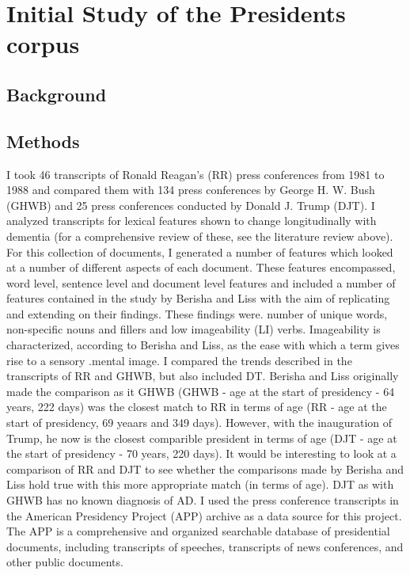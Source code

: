 \documentclass[12pt, twoside, a4paper]{article}
\begin{document}
\section{Initial Study of the Presidents corpus}
\subsection{Background}

\subsection{Methods}
I took 46 transcripts of Ronald Reagan’s (RR) press conferences from 1981 to 1988 and compared them with 134 press conferences by George H. W. Bush (GHWB) and 25 press conferences conducted by Donald J. Trump (DJT).  I analyzed transcripts for lexical features shown to change longitudinally with dementia  (for a comprehensive review of these, see the literature review above). For this collection of documents, I generated a number of features which looked at a number of different aspects of each document. These features encompassed, word level, sentence level and document level features and included a number of features contained in the study by Berisha and Liss with the aim of replicating and extending on their findings. These findings were. number of unique words, non-specific nouns and fillers and low imageability (LI) verbs. Imageability is characterized, according to Berisha and Liss, as the ease with which a term gives rise to a sensory .mental image. I compared the trends described in the transcripts of RR and GHWB, but also included DT. Berisha and Liss originally made the comparison as it GHWB (GHWB - age at the start of presidency - 64 years, 222 days) was the closest match to RR in terms of age (RR  - age at the start of presidency, 69 yeaars and 349 days). However, with the inauguration of Trump, he now is the closest comparible president in terms of age (DJT - age at the start of presidency - 70 years, 220 days). It would be interesting to look at a comparison of RR and DJT to see whether the comparisons made by Berisha and Liss hold true with this more appropriate match (in terms of age). DJT as with GHWB has no known diagnosis of AD. I used the press conference transcripts in the American Presidency Project (APP) archive as a data source for this project. The APP is a comprehensive and organized searchable database of presidential documents, including transcripts of speeches, transcripts of news conferences, and other public documents.
\end{document}
